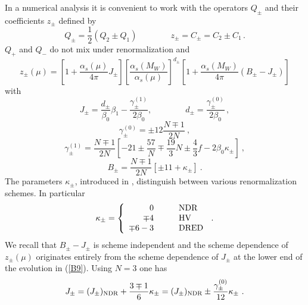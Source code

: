 \documentclass[12pt]{article}
\def\as{\alpha_s}
\begin{document}
\begin{itemize}
\begin{itemize}
In a numerical analysis it is convenient to work with the operators
 $Q_{\pm}$ and their coefficients $z_{\pm}$ defined by
\begin{equation}\label{B7}
Q_{\pm}=\frac{1}{2} (Q_2\pm Q_1)
\qquad
\qquad
z_\pm=C_\pm=C_2\pm C_1 \, .
\end{equation}
$Q_+$ and $Q_-$ do not mix under renormalization and 
\begin{equation}\label{B9}
z_\pm(\mu)=\left[1+\frac{\as(\mu)}{4\pi}J_\pm\right]
      \left[\frac{\as(M_W)}{\as(\mu)}\right]^{d_\pm}
\left[1+\frac{\as(M_W)}{4\pi}(B_\pm-J_\pm)\right]
\end{equation}
with
\begin{equation}\label{B10}
J_\pm=\frac{d_\pm}{\beta_0}\beta_1-\frac{\gamma^{(1)}_\pm}{2\beta_0},
\qquad\qquad
d_\pm=\frac{\gamma^{(0)}_\pm}{2\beta_0} \, ,
\end{equation}
\begin{equation}\label{B11}
\gamma^{(0)}_\pm=\pm 12 \frac{N\mp 1}{2N}~,
\end{equation}
\begin{equation}\label{B12}
\gamma^{(1)}_{\pm}=\frac{N\mp 1}{2N}
\left[-21\pm\frac{57}{N}\mp\frac{19}{3}N \pm
\frac{4}{3}f-2\beta_0\kappa_\pm\right]~,
\end{equation}
\begin{equation}\label{B13}
B_\pm=\frac{N\mp 1}{2N}\left[\pm 11+\kappa_\pm\right]~.
\end{equation}
The parameters
 $\kappa_\pm$, introduced in \cite{AJB94a}, distinguish between various
renormalization schemes. In particular
\begin{equation}
\kappa_\pm = \left\{ \begin{array}{rl}
    0 & \qquad {\rm NDR}  \\
\mp 4 & \qquad {\rm HV} \\
\mp 6-3 & \qquad {\rm DRED}
\end{array}\right. \, .
\label{B14}
\end{equation}
We recall that
 $B_\pm-J_\pm$ is scheme independent
and the scheme
dependence of  $z_\pm(\mu)$ originates 
entirely from the scheme dependence of $J_\pm$ at the lower end of the
evolution in (\ref{B9}). Using $N=3$ one has
\begin{equation}\label{B15}
J_\pm=(J_\pm)_{\rm NDR}+\frac{3\mp 1}{6}\kappa_\pm
=(J_\pm)_{\rm NDR}\pm\frac{\gamma^{(0)}_\pm}{12}\kappa_\pm~.
\end{equation}


\end{itemize}
\end{itemize}
\end{document}
